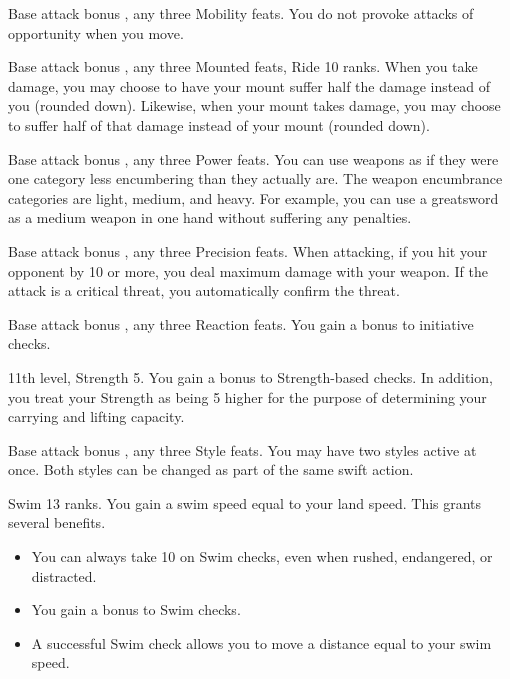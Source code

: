 \featpre Base attack bonus , any three Mobility feats.
\featben You do not provoke attacks of opportunity when you move.

\featpre Base attack bonus , any three Mounted feats, Ride 10 ranks.
\featben When you take damage, you may choose to have your mount suffer half the damage instead of you (rounded down). Likewise, when your mount takes damage, you may choose to suffer half of that damage instead of your mount (rounded down).

\featpres Base attack bonus , any three Power feats.
\featben You can use weapons as if they were one category less encumbering than they actually are. The weapon encumbrance categories are light, medium, and heavy. For example, you can use a greatsword as a medium weapon in one hand without suffering any penalties.

\featpre Base attack bonus , any three Precision feats.
\featben When attacking, if you hit your opponent by 10 or more, you deal maximum damage with your weapon. If the attack is a critical threat, you automatically confirm the threat.

\featpre Base attack bonus , any three Reaction feats.
\featben You gain a  bonus to initiative checks.

\featpre 11th level, Strength 5.
\featben You gain a  bonus to Strength-based checks. In addition, you treat your Strength as being 5 higher for the purpose of determining your carrying and lifting capacity.

\featpre Base attack bonus , any three Style feats.
\featben You may have two styles active at once. Both styles can be changed as part of the same swift action.

\featpre Swim 13 ranks.
\featben You gain a swim speed equal to your land speed. This grants several benefits.
\begin{itemize}
    \item You can always take 10 on Swim checks, even when rushed, endangered, or distracted.
    \item You gain a  bonus to Swim checks.
    \item A successful Swim check allows you to move a distance equal to your swim speed.
\end{itemize}

